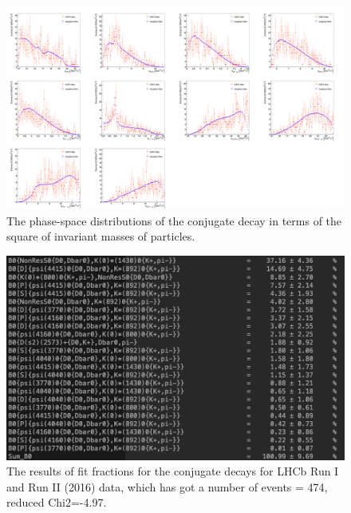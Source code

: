 \begin{figure}[h]
\center
\includegraphics*[width=1.06\linewidth]{amplitude_fit/compare_conj}
\caption{The phase-space distributions of the conjugate decay in terms of the square of invariant masses of particles.}
\label{compare_conj}
\end{figure}
\begin{figure}[h]
\center
\includegraphics*[width=0.96\linewidth]{amplitude_fit/fit_fraction_conj}
\caption{The results of fit fractions for the conjugate decays for LHCb Run I and Run II (2016) data, which has got a number of events = 474, reduced Chi2=-4.97.}
\label{fit_fraction_conj}
\end{figure}
\clearpage
 


